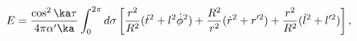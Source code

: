 \begin{equation}
E = \frac{\cos^2\ka\tau}{4\pi\alpha'\ka}\int_0^{2\pi}
 d\sigma\left[ \frac{r^2}{R^2}
(\dot{t}^2 + l^2\dot{\phi}^2 ) + \frac{R^2}{r^2}( \dot{r}^2 + r'^2 )
+ \frac{r^2}{R^2}( \dot{l}^2 + l'^2 ) \right],
\end{equation}

